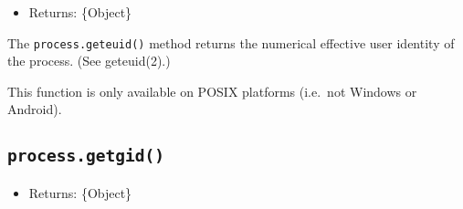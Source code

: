 \begin{itemize}
\tightlist
\item
  Returns: \{Object\}
\end{itemize}

The \texttt{process.geteuid()} method returns the numerical effective
user identity of the process. (See geteuid(2).)

\begin{Shaded}
\begin{Highlighting}[]
   \OperatorTok{;}

\NormalTok{ (}\NormalTok{) \{}
  \NormalTok{(}\SpecialCharTok{$\{}\NormalTok{()}\SpecialCharTok{\}}\VerbatimStringTok{\textasciigrave{}}\NormalTok{)}\OperatorTok{;}
\NormalTok{\}}
\end{Highlighting}
\end{Shaded}

\begin{Shaded}
\begin{Highlighting}[]
  \OperatorTok{=} \NormalTok{(}\NormalTok{)}\OperatorTok{;}

\NormalTok{ (}\NormalTok{) \{}
  \NormalTok{(}\SpecialCharTok{$\{}\NormalTok{()}\SpecialCharTok{\}}\VerbatimStringTok{\textasciigrave{}}\NormalTok{)}\OperatorTok{;}
\NormalTok{\}}
\end{Highlighting}
\end{Shaded}

This function is only available on POSIX platforms (i.e.~not Windows or
Android).

\subsection{\texorpdfstring{\texttt{process.getgid()}}{process.getgid()}}\label{process.getgid}

\begin{itemize}
\tightlist
\item
  Returns: \{Object\}
\end{itemize}

